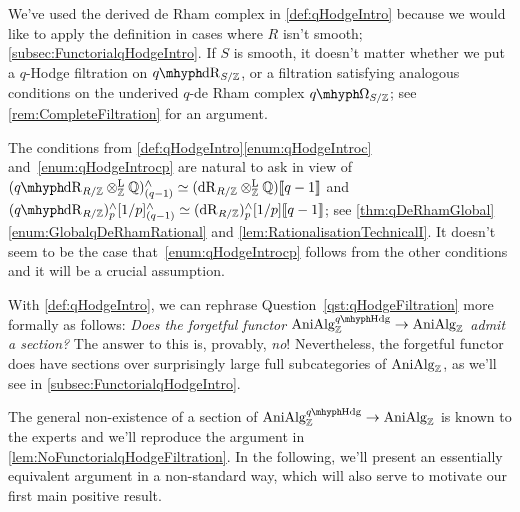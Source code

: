 \documentclass[DIV=12,numbers=enddot,leqno,bibliography=totoc]{scrartcl}
\begin{document}
	\begin{rem}
		We've used the derived de Rham complex in \cref{def:qHodgeIntro} because we would like to apply the definition in cases where $R$ isn't smooth; \cref{subsec:FunctorialqHodgeIntro}. If $S$ is smooth, it doesn't matter whether we put a $q$-Hodge filtration on $\qdeRham_{S/\IZ}$, or a filtration satisfying analogous conditions on the underived $q$-de Rham complex $\qOmega_{S/\IZ}$; see \cref{rem:CompleteFiltration} for an argument.
	\end{rem}
	\begin{rem}
		The conditions from \cref{def:qHodgeIntro}\cref{enum:qHodgeIntroc} and~\cref{enum:qHodgeIntrocp} are natural to ask in view of $(\qdeRham_{R/\IZ}\lotimes_\IZ\IQ)_{(q-1)}^\complete\simeq (\deRham_{R/\IZ}\lotimes_\IZ\IQ)\qpower$ and $(\qdeRham_{R/\IZ})_p^\complete[1/p]_{(q-1)}^\complete\simeq (\deRham_{R/\IZ})_p^\complete[1/p]\qpower$; see \cref{thm:qDeRhamGlobal}\cref{enum:GlobalqDeRhamRational} and \cref{lem:RationalisationTechnicalI}. It doesn't seem to be the case that~\cref{enum:qHodgeIntrocp} follows from the other conditions and it will be a crucial assumption. 
	\end{rem}
	\begin{numpar}
		With \cref{def:qHodgeIntro}, we can rephrase Question~\cref{qst:qHodgeFiltration} more formally as follows: \emph{Does the forgetful functor $\cat{AniAlg}_\IZ^{\qHodge}\rightarrow \cat{AniAlg}_\IZ$ admit a section?} The answer to this is, provably, \emph{no}! Nevertheless, the forgetful functor does have sections over surprisingly large full subcategories of $\mathrm{AniAlg}_{\mathbb{Z}}$, as we'll see in \cref{subsec:FunctorialqHodgeIntro}.
		
		The general non-existence of a section of $\cat{AniAlg}_\IZ^{\qHodge}\rightarrow \cat{AniAlg}_\IZ$ is known to the experts and we'll reproduce the argument in \cref{lem:NoFunctorialqHodgeFiltration}. In the following, we'll present an essentially equivalent argument in a non-standard way, which will also serve to motivate our first main positive result.
	\end{numpar}
\end{document}
